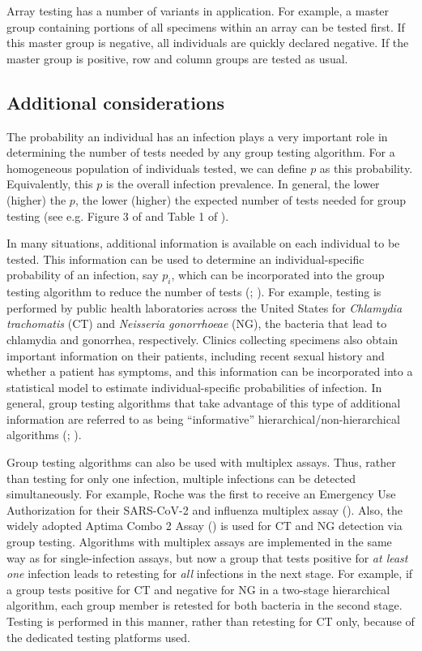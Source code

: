 Array testing has a number of variants in application. For example,
a master group containing portions of all specimens within an array
can be tested first. If this master group is negative, all individuals
are quickly declared negative. If the master group is positive, row
and column groups are tested as usual.

\subsection{Additional considerations}

The probability an individual has an infection plays a very important
role in determining the number of tests needed by any group testing
algorithm. For a homogeneous population of individuals tested, we
can define $p$ as this probability. Equivalently, this $p$ is the
overall infection prevalence. In general, the lower (higher) the $p$,
the lower (higher) the expected number of tests needed for group testing
(see e.g. Figure 3 of \citet{Kim2007} and Table 1 of \citet{bilder2021pool}).

In many situations, additional information is available on each individual
to be tested. This information can be used to determine an individual-specific
probability of an infection, say $p_{i}$, which can be incorporated
into the group testing algorithm to reduce the number of tests (\citealt{Bilder2010b};
\citealt{lewis2012cost}). For example, testing is performed by public
health laboratories across the United States for \emph{Chlamydia trachomatis}
(CT) and \emph{Neisseria gonorrhoeae} (NG), the bacteria that lead
to chlamydia and gonorrhea, respectively. Clinics collecting specimens
also obtain important information on their patients, including recent
sexual history and whether a patient has symptoms, and this information
can be incorporated into a statistical model to estimate individual-specific
probabilities of infection. In general, group testing algorithms that
take advantage of this type of additional information are referred
to as being ``informative'' hierarchical/non-hierarchical algorithms
(\citealt{mcmahan2012informative}; \citealt{mcmahan2012two}).

Group testing algorithms can also be used with multiplex assays. Thus,
rather than testing for only one infection, multiple infections can
be detected simultaneously. For example, Roche was the first to receive
an Emergency Use Authorization for their SARS-CoV-2 and influenza
multiplex assay (\citealt{Roche}). Also, the widely adopted Aptima
Combo 2 Assay (\citealt{Aptima}) is used for CT and NG detection
via group testing. Algorithms with multiplex assays are implemented
in the same way as for single-infection assays, but now a group that
tests positive for \emph{at least one} infection leads to retesting
for \emph{all} infections in the next stage. For example, if a group
tests positive for CT and negative for NG in a two-stage hierarchical
algorithm, each group member is retested for both bacteria in the
second stage. Testing is performed in this manner, rather than retesting
for CT only, because of the dedicated testing platforms used. 

